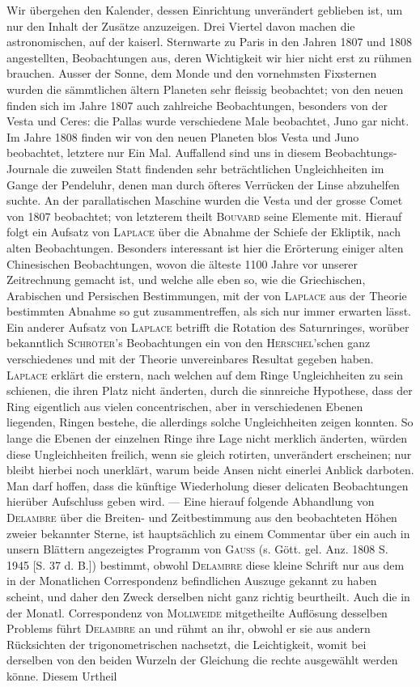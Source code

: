 Wir übergehen den Kalender, dessen Einrichtung unverändert geblieben ist, um nur den Inhalt der Zusätze anzuzeigen. Drei Viertel davon machen die astronomischen, auf der kaiserl. Sternwarte zu Paris in den Jahren 1807 und 1808 angestellten, Beobachtungen aus, deren Wichtigkeit wir hier nicht erst zu rühmen brauchen. Ausser der Sonne, dem Monde und den vornehmsten Fixsternen wurden die sämmtlichen ältern Planeten sehr fleissig beobachtet; von den neuen finden sich im Jahre 1807 auch zahlreiche Beobachtungen, besonders von der Vesta und Ceres: die Pallas wurde verschiedene Male beobachtet, Juno gar nicht. Im Jahre 1808 finden wir von den neuen Planeten blos Vesta und Juno beobachtet, letztere nur Ein Mal. Auffallend sind uns in diesem Beobachtungs-Journale die zuweilen Statt findenden sehr beträchtlichen Ungleichheiten im Gange der Pendeluhr, denen man durch öfteres Verrücken der Linse abzuhelfen suchte. An der parallatischen Maschine wurden die Vesta und der grosse Comet von 1807 beobachtet; von letzterem theilt \textsc{Bouvard} seine Elemente mit. Hierauf folgt ein Aufsatz von \textsc{Laplace} über die Abnahme der Schiefe der Ekliptik, nach alten Beobachtungen. Besonders interessant ist hier die Erörterung einiger alten Chinesischen Beobachtungen, wovon die älteste 1100 Jahre vor unserer Zeitrechnung gemacht ist, und welche alle eben so, wie die Griechischen, Arabischen und Persischen Bestimmungen, mit der von \textsc{Laplace} aus der Theorie bestimmten Abnahme so gut zusammentreffen, als sich nur immer erwarten lässt. Ein anderer Aufsatz von \textsc{Laplace} betrifft die Rotation des Saturnringes, worüber bekanntlich \textsc{Schröter}'s Beobachtungen ein von den \textsc{Herschel}'schen ganz verschiedenes und mit der Theorie unvereinbares Resultat gegeben haben. \textsc{Laplace} erklärt die erstern, nach welchen auf dem Ringe Ungleichheiten zu sein schienen, die ihren Platz nicht änderten, durch die sinnreiche Hypothese, dass der Ring eigentlich aus vielen concentrischen, aber in verschiedenen Ebenen liegenden, Ringen bestehe, die allerdings solche Ungleichheiten zeigen konnten. So lange die Ebenen der einzelnen Ringe ihre Lage nicht merklich änderten, würden diese Ungleichheiten freilich, wenn sie gleich rotirten, unverändert erscheinen; nur bleibt hierbei noch unerklärt, warum beide Ansen nicht einerlei Anblick darboten. Man darf hoffen, dass die künftige Wiederholung dieser delicaten Beobachtungen hierüber Aufschluss geben wird. — Eine hierauf folgende Abhandlung von \textsc{Delambre} über die Breiten- und Zeitbestimmung aus den beobachteten Höhen zweier bekannter Sterne, ist hauptsächlich zu einem Commentar über ein auch in unsern Blättern angezeigtes Programm von \textsc{Gauss} (s. Gött. gel. Anz. 1808 S. 1945 [S. 37 d. B.]) bestimmt, obwohl \textsc{Delambre} diese kleine Schrift nur aus dem in der Monatlichen Correspondenz befindlichen Auszuge gekannt zu haben scheint, und daher den Zweck derselben nicht ganz richtig beurtheilt. Auch die in der Monatl. Correspondenz von \textsc{Mollweide} mitgetheilte Auflösung desselben Problems führt \textsc{Delambre} an und rühmt an ihr, obwohl er sie aus andern Rücksichten der trigonometrischen nachsetzt, die Leichtigkeit, womit bei derselben von den beiden Wurzeln der Gleichung die rechte ausgewählt werden könne. Diesem Urtheil 
